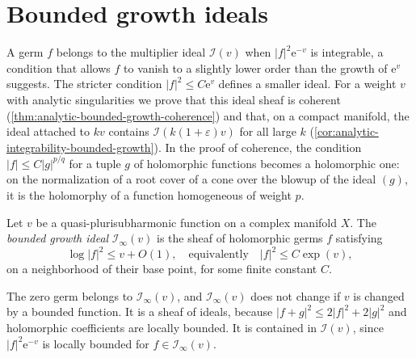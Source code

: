 \section{Bounded growth ideals}
\label{sec:analytic-bounded-growth-ideals}
A germ $f$ belongs to the multiplier ideal $\mathcal I(v)$ when $|f|^2\mathrm e^{-v}$ is integrable, a condition that allows $f$ to vanish to a slightly lower order than the growth of $\mathrm e^v$ suggests. The stricter condition $|f|^2\leq C\mathrm e^v$ defines a smaller ideal. For a weight $v$ with analytic singularities we prove that this ideal sheaf is coherent (\cref{thm:analytic-bounded-growth-coherence}) and that, on a compact manifold, the ideal attached to $kv$ contains $\mathcal I(k(1+\varepsilon)v)$ for all large $k$ (\cref{cor:analytic-integrability-bounded-growth}). In the proof of coherence, the condition $|f|\leq C|g|^{p/q}$ for a tuple $g$ of holomorphic functions becomes a holomorphic one: on the normalization of a root cover of a cone over the blowup of the ideal $(g)$, it is the holomorphy of a function homogeneous of weight $p$.

\begin{definition}\label{def:analytic-bounded-growth-ideal}
Let $v$ be a quasi-plurisubharmonic function on a complex manifold $X$. The \emph{bounded growth ideal} $\mathcal I_\infty(v)$ is the sheaf of holomorphic germs $f$ satisfying
\[
 \log|f|^2\leq v+O(1),
 \quad\text{equivalently}\quad |f|^2\leq C\exp(v),
\]
on a neighborhood of their base point, for some finite constant $C$.
\end{definition}

The zero germ belongs to $\mathcal I_\infty(v)$, and $\mathcal I_\infty(v)$ does not change if $v$ is changed by a bounded function. It is a sheaf of ideals, because $|f+g|^2\leq2|f|^2+2|g|^2$ and holomorphic coefficients are locally bounded. It is contained in $\mathcal I(v)$, since $|f|^2\mathrm e^{-v}$ is locally bounded for $f\in\mathcal I_\infty(v)$.


